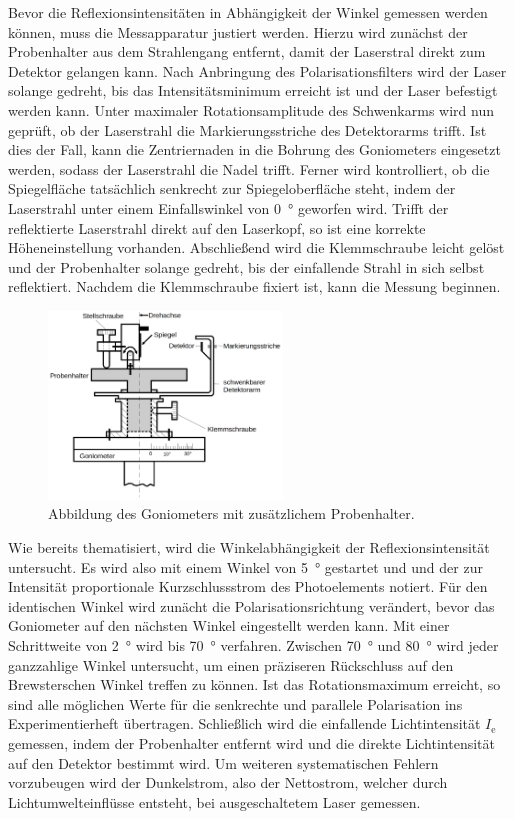 Bevor die Reflexionsintensitäten in Abhängigkeit der Winkel gemessen werden können, muss die Messapparatur justiert werden. Hierzu wird zunächst der Probenhalter aus dem 
Strahlengang entfernt, damit der Laserstral direkt zum Detektor gelangen kann. Nach Anbringung des Polarisationsfilters wird der Laser solange gedreht, bis das 
Intensitätsminimum erreicht ist und der Laser befestigt werden kann. Unter maximaler Rotationsamplitude des Schwenkarms wird nun geprüft, ob der Laserstrahl die 
Markierungsstriche des Detektorarms trifft. Ist dies der Fall, kann die Zentriernaden in die Bohrung des Goniometers eingesetzt werden, sodass der Laserstrahl die 
Nadel trifft. Ferner wird kontrolliert, ob die Spiegelfläche tatsächlich senkrecht zur Spiegeloberfläche steht, indem der Laserstrahl unter einem Einfallswinkel von 
\qty{0}{\degree} geworfen wird. Trifft der reflektierte Laserstrahl direkt auf den Laserkopf, so ist eine korrekte Höheneinstellung vorhanden. Abschließend wird die 
Klemmschraube leicht gelöst und der Probenhalter solange gedreht, bis der einfallende Strahl in sich selbst reflektiert. Nachdem die Klemmschraube fixiert ist, kann die 
Messung beginnen.

\begin{figure}
    \centering 
    \includegraphics[height=5cm]{content/Goniometer.png}
    \caption{Abbildung des Goniometers mit zusätzlichem Probenhalter\cite{Versuchsanleitung_v407}.}
    \label{fig:Goniometer}
\end{figure}

\noindent Wie bereits thematisiert, wird die Winkelabhängigkeit der Reflexionsintensität untersucht. Es wird also mit einem Winkel von \qty{5}{\degree} gestartet und
und der zur Intensität proportionale Kurzschlussstrom des Photoelements notiert. Für den identischen Winkel wird zunächt die Polarisationsrichtung verändert, bevor das 
Goniometer auf den nächsten Winkel eingestellt werden kann. Mit einer Schrittweite von \qty{2}{\degree} wird bis \qty{70}{\degree} verfahren. Zwischen \qty{70}{\degree}
und \qty{80}{\degree} wird jeder ganzzahlige Winkel untersucht, um einen präziseren Rückschluss auf den Brewsterschen Winkel treffen zu können. Ist das Rotationsmaximum 
erreicht, so sind alle möglichen Werte für die senkrechte und parallele Polarisation ins Experimentierheft übertragen. Schließlich wird die einfallende Lichtintensität 
$I_\text{e}$ gemessen, indem der Probenhalter entfernt wird und die direkte Lichtintensität auf den Detektor bestimmt wird. Um weiteren systematischen Fehlern vorzubeugen
wird der Dunkelstrom, also der Nettostrom, welcher durch Lichtumwelteinflüsse entsteht, bei ausgeschaltetem Laser gemessen.


